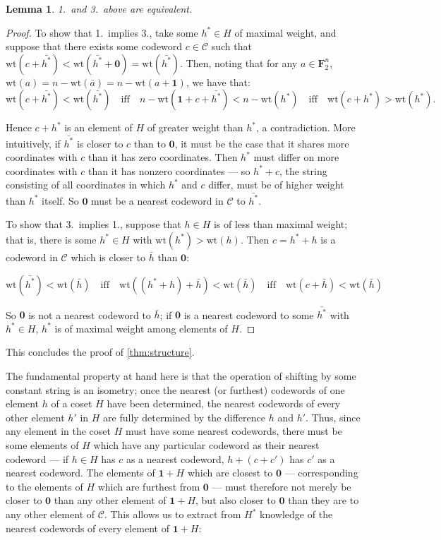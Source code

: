 \documentclass{article}
\newtheorem{lemma}{Lemma}
\newcommand{\FF}{\mathbf{F}}
\newcommand{\calC}{\mathcal{C}}
\newcommand{\wt}{\text{wt}}
\begin{document}
\begin{lemma}\label{lem:13eq}
    1.\ and 3.\ above are equivalent.
\end{lemma}
\begin{proof}
    To show that 1.\ implies 3., take some $h^* \in H$ of maximal weight, and suppose that there exists some codeword $c \in \calC$ such that $\wt(c + \bar{h^*}) < \wt(\bar{h^*} + \mathbf{0}) = \wt(\bar{h^*})$. Then, noting that for any $a \in \FF_2^n$, $\wt(a) = n - \wt(\bar{a}) = n - \wt(a + \mathbf{1})$, we have that: 
    \[
        \wt(c + \bar{h^*}) < \wt(\bar{h^*})
        \quad\text{iff}\quad
        n - \wt(\mathbf{1} + c + \bar{h^*}) < n - \wt(h^*)
        \quad\text{iff}\quad
        \wt(c + h^*)> \wt(h^*).
    \]
    
    Hence $c + h^*$ is an element of $H$ of greater weight than $h^*$, a contradiction. More intuitively, if $\bar{h^*}$ is closer to $c$ than to $\mathbf{0}$, it must be the case that it shares more coordinates with $c$ than it has zero coordinates. Then $h^*$ must differ on more coordinates with $c$ than it has nonzero coordinates --- so $h^* + c$, the string consisting of all coordinates in which $h^*$ and $c$ differ, must be of higher weight than $h^*$ itself. So $\mathbf{0}$ must be a nearest codeword in $\calC$ to $\bar{h^*}$.

    To show that 3.\ implies 1., suppose that $h \in H$ is of less than maximal weight; that is, there is some $h^* \in H$ with $\wt(h^*) > \wt(h)$. Then $c = h^* + h$ is a codeword in $\calC$ which is closer to $\bar{h}$ than $\mathbf{0}$:

    \[
        \wt(\bar{h^*}) < \wt(\bar{h})
        \quad\text{iff}\quad
        \wt((h^* + h) + \bar{h}) < \wt(\bar{h})
        \quad\text{iff}\quad
        \wt(c + \bar{h})< \wt(\bar{h})
    \]

    So $\mathbf{0}$ is not a nearest codeword to $\bar{h}$; if $\mathbf{0}$ is a nearest codeword to some $\bar{h^*}$ with $h^* \in H$, $h^*$ is of maximal weight among elements of $H$.
\end{proof}

This concludes the proof of \cref{thm:structure}.

The fundamental property at hand here is that the operation of shifting by some constant string is an isometry; once the nearest (or furthest) codewords of one element $h$ of a coset $H$ have been determined, the nearest codewords of every other element $h'$ in $H$ are fully determined by the difference $h$ and $h'$. Thus, since any element in the coset $H$ must have some nearest codewords, there must be some elements of $H$ which have any particular codeword as their nearest codeword --- if $h \in H$ has $c$ as a nearest codeword, $h + (c + c')$ has $c'$ as a nearest codeword. The elements of $\mathbf{1} + H$ which are closest to $\mathbf{0}$ --- corresponding to the elements of $H$ which are furthest from $\mathbf{0}$ --- must therefore not merely be closer to $\mathbf{0}$ than any other element of $\mathbf{1} + H$, but also closer to $\mathbf{0}$ than they are to any other element of $\calC$. This allows us to extract from $H^*$ knowledge of the nearest codewords of every element of $\mathbf{1} + H$:
\end{document}
